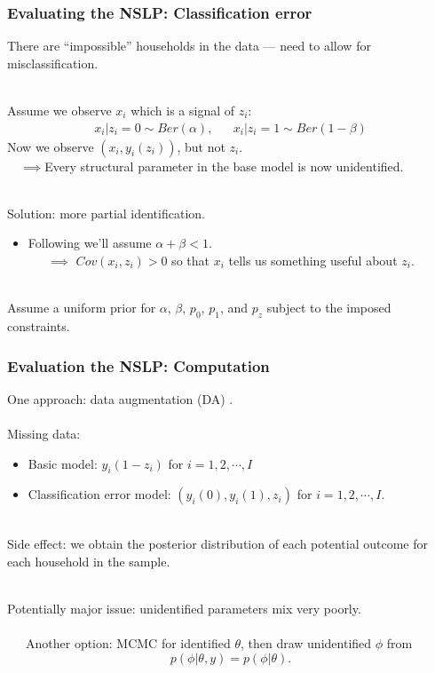 \documentclass[xcolor=dvipsnames]{beamer}
\begin{document}
\begin{frame}
  \frametitle{Evaluating the NSLP: Classification error}
There are ``impossible'' households in the data --- need to allow for misclassification.\\~

\pause Assume we observe $x_i$ which is a signal of $z_i$:
\begin{align*}
  x_i|z_i=0 \sim Ber(\alpha),&&  x_i|z_i=1 \sim Ber(1-\beta)
\end{align*}
\pause Now we observe $(x_i,y_i(z_i))$, but not $z_i$.\\
\ \ $\implies$Every structural parameter in the base model is now unidentified. \\~

\pause Solution: more partial identification.
\pause \begin{itemize}
\item[] Following \cite{bollinger2009bayesian} we'll assume $\alpha + \beta <1$.\\
\ \ \ $\implies$ $Cov(x_i,z_i)>0$ so that $x_i$ tells us something useful about $z_i$.\\~\\
\end{itemize}


\pause Assume a uniform prior for $\alpha$, $\beta$, $p_0$, $p_1$, and $p_z$ subject to the imposed constraints.
\end{frame}


\begin{frame}
\frametitle{Evaluation the NSLP: Computation}
One approach: data augmentation (DA) \citep{tanner1987calculation}.\\~\\

Missing data:
\begin{itemize}
\item Basic model: $y_i(1-z_i)$ for $i=1,2,\cdots,I$
\item Classification error model: $(y_i(0), y_i(1), z_i)$ for $i=1,2, \cdots,I$.\\~
\end{itemize}

\pause Side effect: we obtain the posterior distribution of each potential outcome for each household in the sample.\\~

\pause Potentially major issue: unidentified parameters mix very poorly. \\~\\
\ \ \ Another option: MCMC for identified $\theta$, then draw unidentified $\phi$ from
\[
p(\phi|\theta,y)=p(\phi|\theta).
\]
\end{frame}
\end{document}
